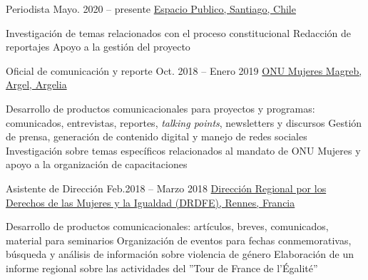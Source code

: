 \begin{joblist}[13.2][7.8][3.4]

\item[Periodista]{Mayo. 2020 -- presente}
    {
    \href{https://www.espaciopublico.cl}{Espacio Publico, Santiago, Chile}
    }
    {
        \vspace{-0.5cm}
        \begin{itemize}
            \iftbftiny \setlength\itemsep{-3pt} \fi
            \cvitem[\checkmark] Investigación de temas relacionados con el proceso constitucional
            \cvitem[\checkmark] Redacción de reportajes
            \cvitem[\checkmark] Apoyo a la gestión del proyecto 
        \end{itemize}
    }


\item[Oficial de comunicación y reporte]{Oct. 2018 -- Enero 2019}
    {
    \href{http://maghreb.unwomen.org/fr}{ONU Mujeres Magreb, Argel, Argelia}
    }
    {
        \vspace{-0.5cm}
        \begin{itemize}
            \iftbftiny \setlength\itemsep{-3pt} \fi
            \cvitem[\checkmark] Desarrollo de productos comunicacionales para proyectos y programas: comunicados, entrevistas, reportes, {\textit{talking points}}, newsletters y discursos
            \cvitem[\checkmark] Gestión de prensa, generación de contenido digital y manejo de redes sociales
            \cvitem[\checkmark] Investigación sobre temas específicos relacionados al mandato de ONU Mujeres y apoyo a la organización de capacitaciones
            
        \end{itemize}
    }


\item[Asistente de Dirección]{Feb.2018 -- Marzo 2018 }
    {
    \href{https://www.egalite-femmes-hommes.gouv.fr/le-secretariat-d-etat/organisation-du-ministere/services-territoriaux/annuaire-des-equipes-regionales-et-departementales/}{Dirección Regional por los Derechos de las Mujeres y la Igualdad (DRDFE), Rennes, Francia}
    }
    {
        \iftbftiny \vspace{-0.5cm} \fi
        \begin{itemize}
            \iftbftiny \setlength\itemsep{-3pt} \fi
            \cvitem[\checkmark] Desarrollo de productos comunicacionales: artículos, breves, comunicados, material para seminarios
            \cvitem[\checkmark] Organización de eventos para fechas conmemorativas, búsqueda y análisis de información sobre violencia de género
            \cvitem[\checkmark] Elaboración de un informe regional sobre las actividades del ''Tour de France de l'Égalité''
        \end{itemize}
    }




\end{joblist}
